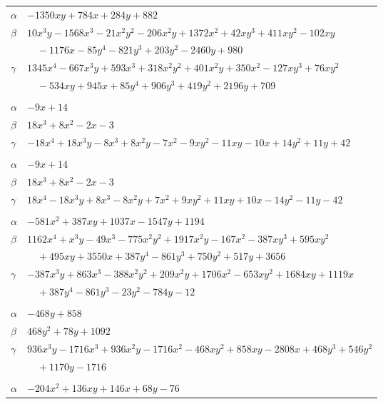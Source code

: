 \documentclass[11pt]{article}
\begin{document}
\begin{longtable}{@{}ll@{}}
$\alpha$ & $-1350xy+784x+284y+882$\\
$\beta$ & $10x^{3}y-1568x^{3}-21x^{2}y^{2}-206x^{2}y+1372x^{2}+42xy^{3}+411xy^{2}-102xy$\\
 & $\quad -1176x-85y^{4}-821y^{3}+203y^{2}-2460y+980$\\
$\gamma$ & $1345x^{4}-667x^{3}y+593x^{3}+318x^{2}y^{2}+401x^{2}y+350x^{2}-127xy^{3}+76xy^{2}$\\
 & $\quad -534xy+945x+85y^{4}+906y^{3}+419y^{2}+2196y+709$\\
\addlinespace[3pt]
\multicolumn{2}{@{}l}{$\{i,j\}=\{5,7\}$, $k_{ij}=5^{2}$}\\
$\alpha$ & $-9x+14$\\
$\beta$ & $18x^{3}+8x^{2}-2x-3$\\
$\gamma$ & $-18x^{4}+18x^{3}y-8x^{3}+8x^{2}y-7x^{2}-9xy^{2}-11xy-10x+14y^{2}+11y+42$\\
\addlinespace[3pt]
\multicolumn{2}{@{}l}{$\{i,j\}=\{5,22\}$, $k_{ij}=5^{2}$}\\
$\alpha$ & $-9x+14$\\
$\beta$ & $18x^{3}+8x^{2}-2x-3$\\
$\gamma$ & $18x^{4}-18x^{3}y+8x^{3}-8x^{2}y+7x^{2}+9xy^{2}+11xy+10x-14y^{2}-11y-42$\\
\addlinespace[3pt]
\multicolumn{2}{@{}l}{$\{i,j\}=\{5,23\}$, $k_{ij}=2\cdot 5^{2}\cdot 7^{2}$}\\
$\alpha$ & $-581x^{2}+387xy+1037x-1547y+1194$\\
$\beta$ & $1162x^{4}+x^{3}y-49x^{3}-775x^{2}y^{2}+1917x^{2}y-167x^{2}-387xy^{3}+595xy^{2}$\\
 & $\quad +495xy+3550x+387y^{4}-861y^{3}+750y^{2}+517y+3656$\\
$\gamma$ & $-387x^{3}y+863x^{3}-388x^{2}y^{2}+209x^{2}y+1706x^{2}-653xy^{2}+1684xy+1119x$\\
 & $\quad +387y^{4}-861y^{3}-23y^{2}-784y-12$\\
\addlinespace[3pt]
\multicolumn{2}{@{}l}{$\{i,j\}=\{5,26\}$, $k_{ij}=2\cdot 3\cdot 5^{2}\cdot 13$}\\
$\alpha$ & $-468y+858$\\
$\beta$ & $468y^{2}+78y+1092$\\
$\gamma$ & $936x^{3}y-1716x^{3}+936x^{2}y-1716x^{2}-468xy^{2}+858xy-2808x+468y^{3}+546y^{2}$\\
 & $\quad +1170y-1716$\\
\addlinespace[3pt]
\multicolumn{2}{@{}l}{$\{i,j\}=\{5,28\}$, $k_{ij}=2\cdot 5^{2}\cdot 7$}\\
$\alpha$ & $-204x^{2}+136xy+146x+68y-76$\\

\end{longtable}
\end{document}
